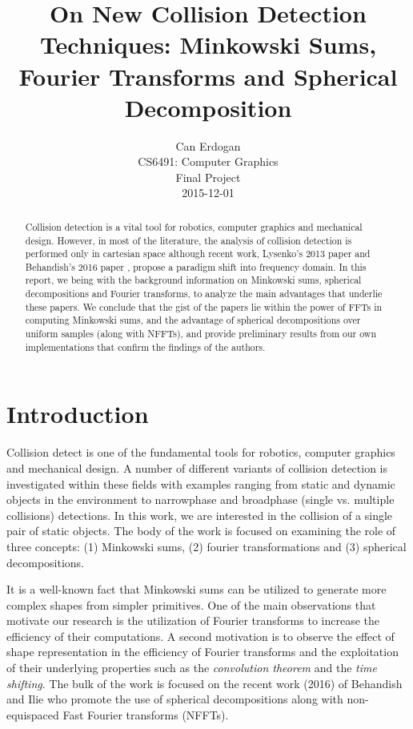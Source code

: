 \documentclass[letterpaper, 10 pt, conference]{ieeeconf}
\title{On New Collision Detection Techniques: Minkowski Sums, Fourier Transforms and Spherical Decomposition}
\author{Can Erdogan \\ CS6491: Computer Graphics \\ Final Project \\ 2015-12-01}
\begin{document}
\maketitle

\begin{abstract}

Collision detection is a vital tool for robotics, computer graphics and mechanical design.
However, in most of the literature, the analysis of collision detection is performed only in cartesian
space although recent work, Lysenko's 2013 paper \cite{lysenko2013fourier}
and Behandish's 2016 paper \cite{behandish2016analytic}, propose a paradigm shift into frequency
domain. In this report, we being with the background information on Minkowski sums, spherical
decompositions and Fourier transforms, to analyze the main advantages that
underlie these papers. We conclude that the gist of the papers lie within the power of FFTs in computing Minkowski sums, and the advantage of 
spherical decompositions over uniform samples (along with NFFTs), and provide preliminary
results from our own implementations that confirm the findings of the authors.
\end{abstract}


\section{Introduction}

Collision detect is one of the fundamental tools for robotics, computer graphics and mechanical 
design. A number of different variants of collision detection is investigated within these fields
with examples ranging from static and dynamic objects in the environment to narrowphase and 
broadphase (single vs. multiple collisions) detections. In this work, we are interested in
the collision of a single pair of static objects. The body of the work is focused on examining
the role of three concepts: (1) Minkowski sums, (2) fourier transformations and (3)
spherical decompositions.

It is a well-known fact that Minkowski sums can be utilized to generate more complex shapes
from simpler primitives. One of the main observations that motivate our research is the utilization
of Fourier transforms to increase the efficiency of their computations. A second motivation is to
observe the effect of shape representation in the efficiency of Fourier transforms and the exploitation
of their underlying properties such as the \textit{convolution theorem} and the \textit{time shifting}.
The bulk of the work is focused on the recent work (2016) of Behandish and Ilie \cite{behandish2016analytic}
who promote the use of spherical decompositions along with non-equispaced Fast Fourier transforms (NFFTs).
\end{document}
